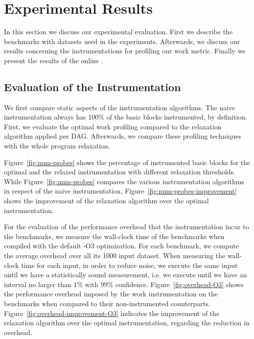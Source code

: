 \section{Experimental Results}

In this section we discuss our experimental evaluation.
First we describe the benchmarks with datasets used in the experiments.
Afterwards, we discuss our results concerning the instrumentations for profiling our work metric.
Finally we present the results of the online {\itercomp}.

\subsection{Evaluation of the Instrumentation}

We first compare static aspects of the instrumentation algorithms.
The naive instrumentation always has 100\% of the basic blocks instrumented, by definition.
First, we evaluate the optimal work profiling compared to the relaxation algorithm applied per DAG.
Afterwards, we compare these profiling techniques with the whole program relaxation.

Figure~\ref{fig:num-probes} shows the percentage of instrumented basic blocks for the optimal and the relaxed instrumentation with different relaxation thresholds.
While Figure~\ref{fig:num-probes} compares the various instrumentation algorithms in respect of the naive instrumentation, Figure~\ref{fig:num-probes-improvement} shows the improvement of the relaxation algorithm  over the optimal instrumentation.


For the evaluation of the performance overhead that the instrumentation incur to the benchmarks, we measure the wall-clock time of the benchmarks when compiled with the default {\flagstype -O3} optimization.
For each benchmark, we compute the average overhead over all its 1000 input dataset.
When measuring the wall-clock time for each input, in order to reduce noise, we execute the same input until we have a statistically sound measurement, i.e. we execute until we have an interval no larger than 1\% with 99\% confidence.
Figure~\ref{fig:overhead-O3} shows the performance overhead imposed by the work instrumentation on the benchmarks when compared to their non-instrumented counterparts.
Figure~\ref{fig:overhead-improvement-O3} indicates the improvement of the relaxation algorithm over the optimal instrumentation, regarding the reduction in overhead.

